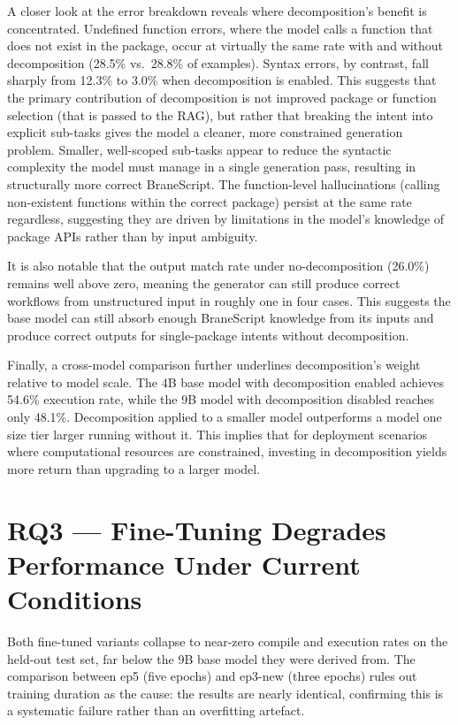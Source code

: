 A closer look at the error breakdown reveals where decomposition's benefit
is concentrated. Undefined function errors, where the model calls a function
that does not exist in the package, occur at virtually the same rate with and
without decomposition (28.5\% vs.\ 28.8\% of examples). Syntax errors, by
contrast, fall sharply from 12.3\% to 3.0\% when decomposition is enabled.
This suggests that the primary contribution of decomposition is not improved
package or function selection (that is passed to the RAG), but rather that 
breaking the intent into explicit sub-tasks gives the model a cleaner, more constrained generation
problem. Smaller, well-scoped sub-tasks appear to reduce the syntactic
complexity the model must manage in a single generation pass, resulting in
structurally more correct BraneScript. The function-level hallucinations
(calling non-existent functions within the correct package) persist at the
same rate regardless, suggesting they are driven by limitations in the model's
knowledge of package APIs rather than by input ambiguity.

It is also notable that the output match rate under no-decomposition (26.0\%)
remains well above zero, meaning the generator can still produce correct
workflows from unstructured input in roughly one in four cases. This suggests
the base model can still absorb enough BraneScript knowledge from its inputs
and produce correct outputs for single-package intents without decomposition.

Finally, a cross-model comparison further underlines decomposition's weight relative to
model scale. The 4B base model with decomposition enabled achieves 54.6\%
execution rate, while the 9B model with decomposition disabled reaches only
48.1\%. Decomposition applied to a smaller model outperforms a model one size
tier larger running without it. This implies that for deployment scenarios
where computational resources are constrained, investing in decomposition
yields more return than upgrading to a larger model.

\section{RQ3 --- Fine-Tuning Degrades Performance Under Current Conditions}

Both fine-tuned variants collapse to near-zero compile and execution rates on
the held-out test set, far below the 9B base model they were derived from. The
comparison between ep5 (five epochs) and ep3-new (three epochs) rules out
training duration as the cause: the results are nearly identical, confirming
this is a systematic failure rather than an overfitting artefact.

